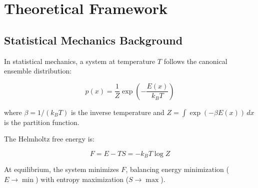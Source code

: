 \documentclass[12pt,a4paper]{article}
\begin{document}
\section{Theoretical Framework}

\subsection{Statistical Mechanics Background}

In statistical mechanics, a system at temperature $T$ follows the canonical ensemble distribution:

\begin{equation}
p(x) = \frac{1}{Z} \exp\left(-\frac{E(x)}{k_B T}\right)
\end{equation}

where $\beta = 1/(k_B T)$ is the inverse temperature and $Z = \int \exp(-\beta E(x)) \, dx$ is the partition function.

The Helmholtz free energy is:

\begin{equation}
F = E - TS = -k_B T \log Z
\end{equation}

At equilibrium, the system minimizes $F$, balancing energy minimization ($E \to \min$) with entropy maximization ($S \to \max$).
\end{document}
